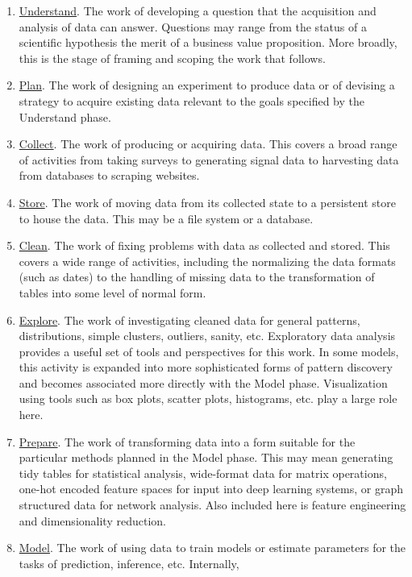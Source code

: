 \documentclass[
  letterpaper,
]{report}
\providecommand{\tightlist}{%
  \setlength{\itemsep}{0pt}\setlength{\parskip}{0pt}}\usepackage{longtable,booktabs,array}
\begin{document}
\begin{enumerate}
\def\labelenumi{\arabic{enumi}.}
\tightlist
\item
  \uline{Understand}. The work of developing a question that the
  acquisition and analysis of data can answer. Questions may range from
  the status of a scientific hypothesis the merit of a business value
  proposition. More broadly, this is the stage of framing and scoping
  the work that follows.
\item
  \uline{Plan}. The work of designing an experiment to produce data or
  of devising a strategy to acquire existing data relevant to the goals
  specified by the Understand phase.
\item
  \uline{Collect}. The work of producing or acquiring data. This covers
  a broad range of activities from taking surveys to generating signal
  data to harvesting data from databases to scraping websites.
\item
  \uline{Store}. The work of moving data from its collected state to a
  persistent store to house the data. This may be a file system or a
  database.
\item
  \uline{Clean}. The work of fixing problems with data as collected and
  stored. This covers a wide range of activities, including the
  normalizing the data formats (such as dates) to the handling of
  missing data to the transformation of tables into some level of normal
  form.
\item
  \uline{Explore}. The work of investigating cleaned data for general
  patterns, distributions, simple clusters, outliers, sanity, etc.
  Exploratory data analysis provides a useful set of tools and
  perspectives for this work. In some models, this activity is expanded
  into more sophisticated forms of pattern discovery and becomes
  associated more directly with the Model phase. Visualization using
  tools such as box plots, scatter plots, histograms, etc. play a large
  role here.
\item
  \uline{Prepare}. The work of transforming data into a form suitable
  for the particular methods planned in the Model phase. This may mean
  generating tidy tables for statistical analysis, wide-format data for
  matrix operations, one-hot encoded feature spaces for input into deep
  learning systems, or graph structured data for network analysis. Also
  included here is feature engineering and dimensionality reduction.
\item
  \uline{Model}. The work of using data to train models or estimate
  parameters for the tasks of prediction, inference, etc. Internally,

\end{enumerate}
\end{document}
